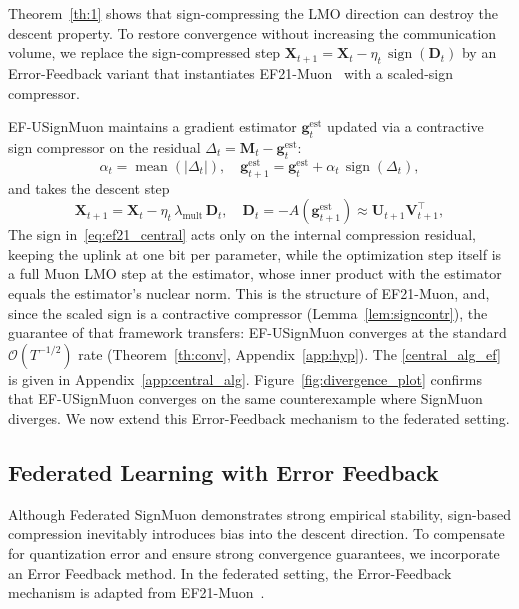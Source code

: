 \documentclass{article}
\begin{document}
Theorem~\ref{th:1} shows that sign-compressing the LMO direction can destroy the descent property. To restore convergence without increasing the communication volume, we replace the sign-compressed step $\mathbf{X}_{t+1}=\mathbf{X}_t -\eta_t\,\operatorname{sign}(\mathbf{D}_t)$ by an Error-Feedback variant that instantiates EF21-Muon~\cite{gruntkowska2025error} with a scaled-sign compressor.

EF-USignMuon maintains a gradient estimator $\mathbf{g}_t^{\mathrm{est}}$ updated via a contractive sign compressor on the residual $\Delta_t = \mathbf{M}_t - \mathbf{g}_t^{\mathrm{est}}$: 
\begin{equation}
\alpha_t = \operatorname{mean}(|\Delta_t|),\quad
\mathbf{g}_{t+1}^{\mathrm{est}} = \mathbf{g}_t^{\mathrm{est}} + \alpha_t\,\operatorname{sign}(\Delta_t),
\label{eq:ef21_central}
\end{equation}
and takes the descent step
\begin{equation}
\mathbf{X}_{t+1} = \mathbf{X}_t - \eta_t\,\lambda_{\mathrm{mult}}\,\mathbf{D}_t,
\quad \mathbf{D}_t = -A(\mathbf{g}_{t+1}^{\mathrm{est}}) \approx \mathbf{U}_{t+1}\mathbf{V}^\top_{t+1},
\label{eq:ef_step}
\end{equation}
The sign in~\eqref{eq:ef21_central} acts only on the internal compression residual, keeping the uplink at one bit per parameter, while the optimization step itself is a full Muon LMO step at the estimator, whose inner product with the estimator equals the estimator's nuclear norm. This is the structure of EF21-Muon, and, since the scaled sign is a contractive compressor (Lemma~\ref{lem:signcontr}), the guarantee of that framework transfers: EF-USignMuon converges at the standard $\mathcal{O}(T^{-1/2})$ rate (Theorem~\ref{th:conv}, Appendix~\ref{app:hyp}). The \cref{central_alg_ef} is given in Appendix~\ref{app:central_alg}. Figure~\ref{fig:divergence_plot} confirms that EF-USignMuon converges on the same counterexample where SignMuon diverges. We now extend this Error-Feedback mechanism to the federated setting.

\subsection{Federated Learning with Error Feedback}
Although Federated SignMuon demonstrates strong empirical stability, sign-based compression inevitably introduces bias into the descent direction. To compensate for quantization error and ensure strong convergence guarantees, we incorporate an Error Feedback method. In the federated setting, the Error-Feedback mechanism is adapted from EF21-Muon~\cite{gruntkowska2025error}. 
\end{document}
